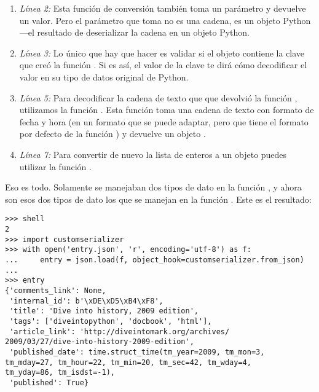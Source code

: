 \begin{enumerate}

\item \emph{Línea 2:} Esta función de conversión también toma un parámetro y devuelve un valor. Pero el parámetro que toma no es una cadena, es un objeto Python ---el resultado de deserializar la cadena  en un objeto Python.

\item \emph{Línea 3:} Lo único que hay que hacer es validar si el objeto contiene la clave  que creó la función . Si es así, el valor de la clave  te dirá cómo decodificar el valor en su tipo de datos original de Python.

\item \emph{Línea 5:} Para decodificar la cadena de texto que que devolvió la función , utilizamos la función . Esta función toma una cadena de texto con formato de fecha y hora (en un formato que se puede adaptar, pero que tiene el formato por defecto de la función ) y devuelve un objeto .

\item \emph{Línea 7:} Para convertir de nuevo la lista de enteros a un objeto  puedes utilizar la función .

\end{enumerate}

Eso es todo. Solamente se manejaban dos tipos de dato en la función , y ahora son esos dos tipos de dato los que se manejan en la función . Este es el resultado:

\noindent\begin{minipage}{\textwidth}
\begin{lstlisting}[mathescape=True]
>>> shell
2
>>> import customserializer
>>> with open('entry.json', 'r', encoding='utf-8') as f:
...     entry = json.load(f, object_hook=customserializer.from_json)
... 
>>> entry                              
{'comments_link': None,
 'internal_id': b'\xDE\xD5\xB4\xF8',
 'title': 'Dive into history, 2009 edition',
 'tags': ['diveintopython', 'docbook', 'html'],
 'article_link': 'http://diveintomark.org/archives/
2009/03/27/dive-into-history-2009-edition',
 'published_date': time.struct_time(tm_year=2009, tm_mon=3, 
tm_mday=27, tm_hour=22, tm_min=20, tm_sec=42, tm_wday=4,
tm_yday=86, tm_isdst=-1),
 'published': True}
\end{lstlisting}
\end{minipage}

